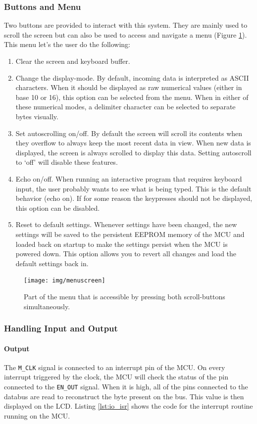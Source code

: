 \subsubsection{Buttons and Menu}
Two buttons are provided to interact with this system. They are mainly used to scroll the screen but can also be used to access and navigate a menu (Figure \ref{fig:menuscreen}). This menu let's the user do the following:
\begin{enumerate}
\item Clear the screen and keyboard buffer.
\item Change the display-mode. By default, incoming data is interpreted as ASCII characters. When it should be displayed as raw numerical values (either in base 10 or 16), this option can be selected from the menu. When in either of these numerical modes, a delimiter character can be selected to separate bytes visually.
\item Set autoscrolling on/off. By default the screen will scroll its contents when they overflow to always keep the most recent data in view. When new data is displayed, the screen is always scrolled to display this data. Setting autoscroll to `off' will disable these features.
\item Echo on/off. When running an interactive program that requires keyboard input, the user probably wants to see what is being typed. This is the default behavior (echo on). If for some reason the keypresses should not be displayed, this option can be disabled.
\item Reset to default settings. Whenever settings have been changed, the new settings will be saved to the persistent EEPROM memory of the MCU and loaded back on startup to make the settings persist when the MCU is powered down. This option allows you to revert all changes and load the default settings back in.
\end{enumerate}

\begin{figure}[h]
  \centering
  \texttt{[image: img/menuscreen]}
  \caption{Part of the menu that is accessible by pressing both scroll-buttons simultaneously.}
  \label{fig:menuscreen}
\end{figure}


\subsubsection{Handling Input and Output}
\paragraph{Output} The \texttt{M\_CLK} signal is connected to an interrupt pin of the MCU. On every interrupt triggered by the clock, the MCU will check the status of the pin connected to the \texttt{EN\_OUT} signal. When it is high, all of the pins connected to the databus are read to reconstruct the byte present on the bus. This value is then displayed on the LCD. Listing \ref{lst:io_isr} shows the code for the interrupt routine running on the MCU.

